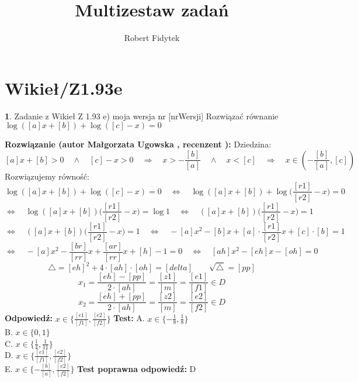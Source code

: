 \documentclass[12pt, a4paper]{article}
\title{Multizestaw zadań}
\author{Robert Fidytek}
\date{}
\theoremstyle{definition} %
\newtheorem{zad}{}
\newcommand{\kategoria}[1]{\section{#1}} %
\newcommand{\zadStart}[1]{\begin{zad}#1\newline} %
\newcommand{\zadStop}{\end{zad}}   %
\newcommand{\rozwStart}[2]{\noindent \textbf{Rozwiązanie (autor #1 , recenzent #2): }\newline} %
\newcommand{\rozwStop}{\newline}                                            %
\newcommand{\odpStart}{\noindent \textbf{Odpowiedź:}\newline}    %
\newcommand{\odpStop}{\newline}                                             %
\newcommand{\testStart}{\noindent \textbf{Test:}\newline} %
\newcommand{\testStop}{\newline} %
\newcommand{\kluczStart}{\noindent \textbf{Test poprawna odpowiedź:}\newline} %
\newcommand{\kluczStop}{\newline} %
\begin{document}
\maketitle


\kategoria{Wikieł/Z1.93e}
\zadStart{Zadanie z Wikieł Z 1.93 e) moja wersja nr [nrWersji]}
Rozwiązać równanie $\log{([a]x+[b])} + \log{([c]-x)} = 0$
\zadStop
\rozwStart{Małgorzata Ugowska}{}
Dziedzina:
$$[a]x+[b] > 0 \quad \land \quad [c]-x > 0 \quad \Longrightarrow \quad x > -\frac{[b]}{[a]} \quad \land \quad x<[c]  \quad \Longrightarrow \quad x \in (-\frac{[b]}{[a]}, [c])$$
Rozwiązujemy równo\'sć:
$$\log{([a]x+[b])} + \log{([c]-x)} = 0 \quad \Longleftrightarrow \quad \log{([a]x+[b])} + \log{\Big(\frac{[r1]}{[r2]}-x\Big)} = 0 $$
$$ \Longleftrightarrow \quad \log{([a]x+[b])\Big(\frac{[r1]}{[r2]}-x\Big)} = \log{1} \quad \Longleftrightarrow \quad ([a]x+[b])\Big(\frac{[r1]}{[r2]}-x\Big) = 1 $$
$$ \Longleftrightarrow \quad ([a]x+[b])\Big(\frac{[r1]}{[r2]}-x\Big) = 1 \quad \Longleftrightarrow \quad -[a] x^2 -[b] x + [a] \cdot \frac{[r1]}{[r2]} x + [c] \cdot [b] = 1$$
$$ \Longleftrightarrow \quad -[a] x^2 -\frac{[br]}{[rr]} x + \frac{[ar]}{[rr]} x + [h] -1 =0 \quad \Longleftrightarrow \quad [ah] x^2 - [eh] x - [oh]=0$$
$$ \bigtriangleup =[eh]^2+4 \cdot [ah] \cdot [oh] = [delta] \qquad \sqrt{\bigtriangleup} = [pp]$$
$$ x_1 = \frac{[eh]-[pp]}{2 \cdot [ah]} = \frac{[z1]}{[m]} = \frac{[e1]}{[f1]} \in D$$
$$ x_2 = \frac{[eh]+[pp]}{2 \cdot [ah]} = \frac{[z2]}{[m]} = \frac{[e2]}{[f2]} \in D$$
\rozwStop
\odpStart
$x \in \{\frac{[e1]}{[f1]}, \frac{[e2]}{[f2]}\}$
\odpStop
\testStart
A. $x \in \{-\frac{1}{8}, \frac{1}{8}\}$\\
B. $x \in \{0, 1\}$\\
C. $x \in \{\frac{1}{4}, \frac{1}{11}\}$\\
D. $x \in \{\frac{[e1]}{[f1]}, \frac{[e2]}{[f2]}\}$\\
E. $x \in \{-\frac{[b]}{[a]}, \frac{[e2]}{[f2]}\}$
\testStop
\kluczStart
D
\kluczStop
\end{document}
